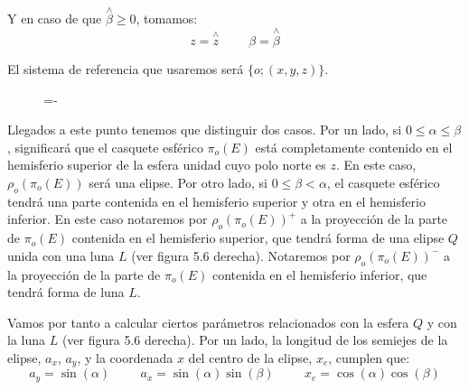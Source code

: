Y en caso de que $\overset{\wedge}{\beta}\geq 0$, tomamos:
$$z = \overset{\wedge}{z}\hspace{1cm} \beta = \overset{\wedge}{\beta}$$

El sistema de referencia que usaremos será $\{o;(x,y,z)\}$.

\begin{figure}[h]
  \lineskip=-\fboxrule
\end{figure}

Llegados a este punto tenemos que distinguir dos casos. Por un lado, si $0\leq\alpha\leq\beta$, significará que el casquete esférico $\pi_o(E)$ está completamente contenido en el hemisferio superior de la esfera unidad cuyo polo norte es $z$. En este caso, $\rho_o(\pi_o(E))$ será una elipse. Por otro lado, si $0\leq\beta<\alpha$, el casquete esférico tendrá una parte contenida en el hemisferio superior y otra en el hemisferio inferior. En este caso notaremos por $\rho_o(\pi_o(E))^+$ a la proyección de la parte de $\pi_o(E)$ contenida en el hemisferio superior, que tendrá forma de una elipse $Q$ unida con una luna $L$ (ver figura 5.6 derecha). Notaremos por $\rho_o(\pi_o(E))^-$ a la proyección de la parte de $\pi_o(E)$ contenida en el hemisferio inferior, que tendrá forma de luna $L$.

Vamos por tanto a calcular ciertos parámetros relacionados con la esfera $Q$ y con la luna $L$ (ver figura 5.6 derecha). Por un lado, la longitud de los semiejes de la elipse, $a_x$, $a_y$, y la coordenada $x$ del centro de la elipse, $x_e$, cumplen que:
$$a_y=\sin(\alpha) \hspace{1cm} a_x=\sin(\alpha)\sin(\beta) \hspace{1cm} x_e=\cos(\alpha)\cos(\beta)$$

